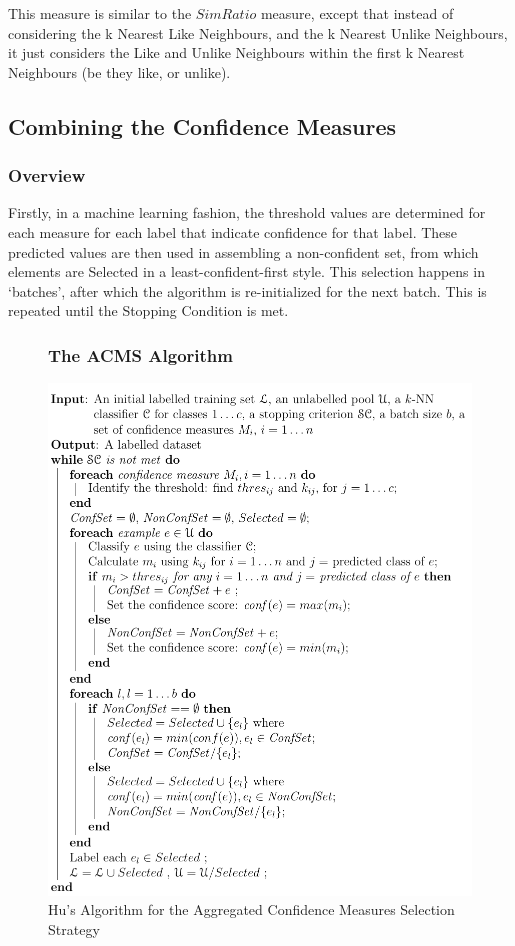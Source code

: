 \documentclass[a4paper,11pt]{report}
\begin{document}
This measure is similar to the $SimRatio$ measure, except that instead of considering the k Nearest Like Neighbours, and the k Nearest Unlike Neighbours, it just considers the Like and Unlike Neighbours within the first k Nearest Neighbours (be they like, or unlike).

\subsection{Combining the Confidence Measures}

\subsubsection{Overview}
Firstly, in a machine learning fashion, the threshold values are determined for each measure for each label that indicate confidence for that label. These predicted values are then used in assembling a non-confident set, from which elements are Selected in a least-confident-first style. This selection happens in `batches', after which the algorithm is re-initialized for the next batch. This is repeated until the Stopping Condition is met.

\begin{figure}[h!] 
\subsubsection{The ACMS Algorithm}
\centering
\includegraphics[scale=0.75]{./Others/Hu2011AggregrateAlgorithm}
\caption*{Hu's Algorithm for the Aggregated Confidence Measures Selection Strategy}
\end{figure}
\end{document}
